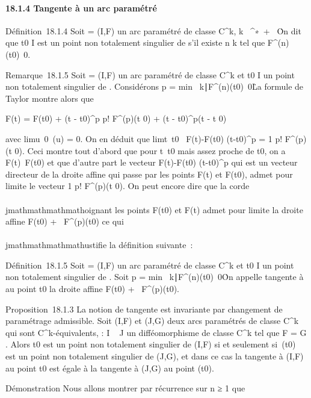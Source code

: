 \paragraph{18.1.4 Tangente à un arc paramétré}

Définition~18.1.4 Soit \Gamma = (I,F) un arc paramétré de classe
C^k, k \in {}~^∗\cup\ +
\infty~\. On dit que t0 \in I est un point non
totalement singulier de \Gamma s'il existe n \leq k tel que
F^(n)(t0)\neq~0.

Remarque~18.1.5 Soit \Gamma = (I,F) un arc paramétré de classe C^k
et t0 \in I un point non totalement singulier de \Gamma. Considérons
p = min~\n \leq
k∣F^(n)(t0)\mathrel\neq~0\.
La formule de Taylor montre alors que

F(t) = F(t0) + (t - t0)^p
\over p! F^(p)(t 0) + (t -
t0)^p\epsilon(t - t 0)

avec limu\rightarrow~0~\epsilon(u) = 0. On en déduit
que limt\rightarrow~t0~
F(t)-F(t0) \over
(t-t0)^p = 1 \over p!
F^(p)(t 0). Ceci montre tout d'abord que pour
t\neq~t0 mais assez proche de
t0, on a F(t)\neq~F(t0) et
que d'autre part le vecteur  F(t)-F(t0) \over
(t-t0)^p qui est un vecteur directeur de la
droite affine qui passe par les points F(t) et F(t0), admet
pour limite le vecteur  1 \over p!
F^(p)(t 0). On peut encore dire que la corde
\\\\jmathmathmathmathoignant les points F(t0) et F(t) admet pour limite la droite
affine F(t0) + ~F^(p)(t0) ce qui \\\\jmathmathmathmathustifie
la définition suivante~:

Définition~18.1.5 Soit \Gamma = (I,F) un arc paramétré de classe
C^k et t0 \in I un point non totalement singulier de
\Gamma. Soit p = min~\n \leq
k∣F^(n)(t0)\mathrel\neq~0\.
On appelle tangente à \Gamma au point t0 la droite affine
F(t0) + ~F^(p)(t0).

Proposition~18.1.3 La notion de tangente est invariante par changement
de paramétrage admissible. Soit (I,F) et (J,G) deux arcs paramétrés de
classe C^k qui sont C^k-équivalents, \theta : I \rightarrow~ J un
difféomorphisme de classe C^k tel que F = G \cdot \theta. Alors
t0 est un point non totalement singulier de (I,F) si et
seulement si~\theta(t0) est un point non totalement singulier de
(J,G), et dans ce cas la tangente à (I,F) au point t0 est
égale à la tangente à (J,G) au point \theta(t0).

Démonstration Nous allons montrer par récurrence sur n ≥ 1 que

